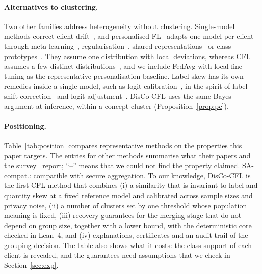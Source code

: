 \paragraph{Alternatives to clustering.} Two other families address heterogeneity without clustering. Single-model methods correct client drift~\citep{li2020fedprox,karimireddy2020scaffold}, and personalised FL~\citep{tan2022pflsurvey} adapts one model per client through meta-learning~\citep{fallah2020perfedavg}, regularisation~\citep{tdinh2020pfedme,li2021ditto}, shared representations~\citep{collins2021fedrep} or class prototypes~\citep{tan2022fedproto}. They assume one distribution with local deviations, whereas CFL assumes a few distinct distributions~\citep{benali2026survey}, and we include FedAvg with local fine-tuning as the representative personalisation baseline. Label skew has its own remedies inside a single model, such as logit calibration~\citep{zhang2022fedlc}, in the spirit of label-shift correction~\citep{lipton2018labelshift} and logit adjustment~\citep{menon2021logit}. DisCo-CFL uses the same Bayes argument at inference, within a concept cluster (Proposition~\ref{prop:pc}).

\paragraph{Positioning.} Table~\ref{tab:position} compares representative methods on the properties this paper targets. The entries for other methods summarise what their papers and the survey~\citep[Tables~3 and~5]{benali2026survey} report; ``--'' means that we could not find the property claimed. SA-compat.: compatible with secure aggregation. To our knowledge, DisCo-CFL is the first CFL method that combines (i) a similarity that is invariant to label and quantity skew at a fixed reference model and calibrated across sample sizes and privacy noise, (ii) a number of clusters set by one threshold whose population meaning is fixed, (iii) recovery guarantees for the merging stage that do not depend on group size, together with a lower bound, with the deterministic core checked in Lean~4, and (iv) explanations, certificates and an audit trail of the grouping decision. The table also shows what it costs: the class support of each client is revealed, and the guarantees need assumptions that we check in Section~\ref{sec:exp}.

